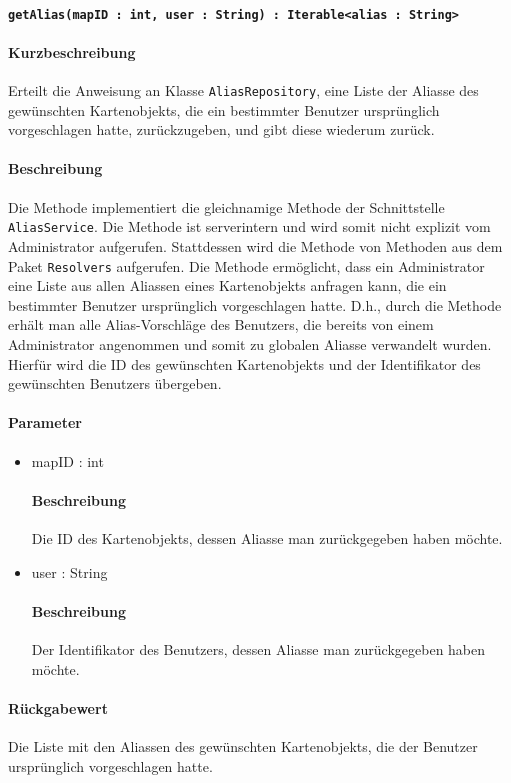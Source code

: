 \paragraph{\texttt{getAlias(mapID : int, user : String) : Iterable<alias : String>}}%
\paragraph*{Kurzbeschreibung}
Erteilt die Anweisung an Klasse \texttt{AliasRepository}, eine Liste der Aliasse des gewünschten Kartenobjekts, die ein bestimmter Benutzer ursprünglich vorgeschlagen hatte, zurückzugeben, und gibt diese wiederum zurück.
\paragraph*{Beschreibung}
Die Methode implementiert die gleichnamige Methode der Schnittstelle \texttt{AliasService}.
Die Methode ist serverintern und wird somit nicht explizit vom Administrator aufgerufen.
Stattdessen wird die Methode von Methoden aus dem Paket \texttt{Resolvers} aufgerufen.
Die Methode ermöglicht, dass ein Administrator eine Liste aus allen Aliassen eines Kartenobjekts anfragen kann, die ein bestimmter Benutzer ursprünglich vorgeschlagen hatte.
D.h., durch die Methode erhält man alle Alias-Vorschläge des Benutzers, die bereits von einem Administrator angenommen und somit zu globalen Aliasse verwandelt wurden.
Hierfür wird die ID des gewünschten Kartenobjekts und der Identifikator des gewünschten Benutzers übergeben.
\paragraph*{Parameter}
\begin{itemize}
    \item mapID : int
    		\paragraph*{Beschreibung}
    		Die ID des Kartenobjekts, dessen Aliasse man zurückgegeben haben möchte.
    	\item user : String
    		\paragraph*{Beschreibung}
    		Der Identifikator des Benutzers, dessen Aliasse man zurückgegeben haben möchte.
\end{itemize}
\paragraph*{Rückgabewert}
Die Liste mit den Aliassen des gewünschten Kartenobjekts, die der Benutzer ursprünglich vorgeschlagen hatte.
